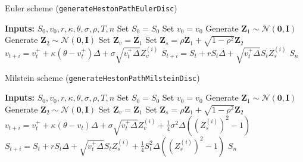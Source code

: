 \documentclass[11pt]{article}
\numberwithin{equation}{section}
\begin{document}
\begin{algorithm}
\caption{Euler scheme (\texttt{generateHestonPathEulerDisc})}
\begin{algorithmic}
\State \textbf{Inputs:} $S_0, v_0, r, \kappa, \theta, \sigma, \rho, T, n$
\State Set $S_0 = S_0$
\State Set $v_0 = v_0$
\State Generate $\mathbf{Z}_1\sim \mathcal{N}(\mathbf{0}, \mathbf{I})$
\State Generate $\mathbf{Z}_2 \sim \mathcal{N}(\mathbf{0}, \mathbf{I})$
\State Set $\mathbf{Z}_v = \mathbf{Z}_1$
\State Set $\mathbf{Z}_s = \rho \mathbf{Z}_1 + \sqrt{1 - \rho^2} \mathbf{Z}_2$
    \State $v_{t+i}=v_t^++\kappa(\theta-v_t^+)\Delta+\sigma \sqrt{v_t^+ \Delta}Z_v^{(i)}$
    \State $S_{t+i}=S_t+rS_t\Delta+\sqrt{v_t^+ \Delta}S_tZ_s^{(i)}$
\EndFor
\State \Return $S_n$
\end{algorithmic}
\end{algorithm}

\begin{algorithm}
\caption{Milstein scheme (\texttt{generateHestonPathMilsteinDisc})}
\begin{algorithmic}
\State \textbf{Inputs:} $S_0, v_0, r, \kappa, \theta, \sigma, \rho, T, n$
\State Set $S_0 = S_0$
\State Set $v_0 = v_0$
\State Generate $\mathbf{Z}_1\sim \mathcal{N}(\mathbf{0}, \mathbf{I})$
\State Generate $\mathbf{Z}_2 \sim \mathcal{N}(\mathbf{0}, \mathbf{I})$
\State Set $\mathbf{Z}_v = \mathbf{Z}_1$
\State Set $\mathbf{Z}_s = \rho \mathbf{Z}_1 + \sqrt{1 - \rho^2} \mathbf{Z}_2$
    \State $v_{t+i}=v_t^++\kappa(\theta-v_t)\Delta+\sigma \sqrt{v_t^+ \Delta}Z_v^{(i)}+\frac{1}{4}\sigma^2 \Delta \left( \left( Z_s^{(i)}\right)^2-1\right)$
    \State $S_{t+i}=S_t+rS_t\Delta+\sqrt{v_t^+ \Delta}S_tZ_s^{(i)}+\frac{1}{4}S_t^2\Delta \left (\left( Z_s^{(i)}\right)^2-1\right)$
\EndFor
\State \Return $S_n$
\end{algorithmic}
\end{algorithm}
\end{document}
